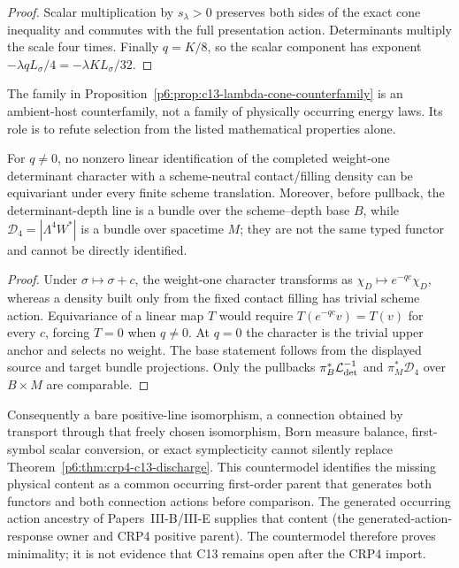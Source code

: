 \documentclass[11pt,a4paper]{article}
\begin{document}
\begin{proof}
Scalar multiplication by $s_\lambda>0$ preserves both sides of the exact
cone inequality and commutes with the full presentation action.  Determinants
multiply the scale four times.  Finally $q=K/8$, so the scalar component has
exponent $-\lambda qL_\sigma/4=-\lambda KL_\sigma/32$.
\end{proof}

The family in
Proposition~\ref{p6:prop:c13-lambda-cone-counterfamily} is an ambient-host
counterfamily, not a family of physically occurring energy laws.  Its role is
to refute selection from the listed mathematical properties alone.

\begin{proposition}
\label{p6:prop:c13-scheme-neutral-density-no-go}
For $q\ne0$, no nonzero linear identification of the completed weight-one
determinant character with a scheme-neutral contact/filling density can be
equivariant under every finite scheme translation.  Moreover, before
pullback, the determinant-depth line is a bundle over the scheme--depth base
$B$, while $\mathcal D_4=|\Lambda^4W^*|$ is a bundle over spacetime $M$;
they are not the same typed functor and cannot be directly identified.
\end{proposition}

\begin{proof}
Under $\sigma\mapsto\sigma+c$, the weight-one character transforms as
$\chi_D\mapsto e^{-qc}\chi_D$, whereas a density built only from the fixed
contact filling has trivial scheme action.  Equivariance of a linear map $T$
would require $T(e^{-qc}v)=T(v)$ for every $c$, forcing $T=0$ when
$q\ne0$.  At $q=0$ the character is the trivial upper anchor and selects
no weight.  The base statement follows from the displayed source and target
bundle projections.  Only the pullbacks
$\pi_B^*\mathcal L_{\rm det}^{-1}$ and
$\pi_M^*\mathcal D_4$ over $B\times M$ are comparable.
\end{proof}

Consequently a bare positive-line isomorphism, a connection obtained by
transport through that freely chosen isomorphism, Born measure balance,
first-symbol scalar conversion, or exact symplecticity cannot silently replace
Theorem~\ref{p6:thm:crp4-c13-discharge}.  This countermodel identifies the
missing physical content as a common occurring first-order parent that
generates both functors and both connection actions before comparison.
The generated occurring action ancestry of Papers~III-B/III-E supplies
that content (the generated-action-response owner and CRP4 positive parent).  The
countermodel therefore proves minimality; it is not evidence that C13 remains
open after the CRP4 import.
\end{document}
